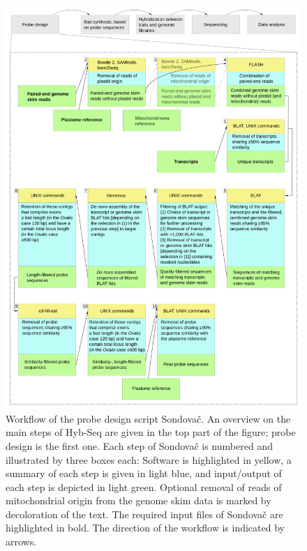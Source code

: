 \documentclass[a4paper, 11pt, twoside]{article}
\begin{document}
\begin{figure}[p]
\begin{center}
\includegraphics[width=14cm]{pipeline_workflow.png}
\end{center}
\caption[Workflow of the probe design script Sondovač]{Workflow of the probe design script Sondovač. An overview on the main steps of Hyb-Seq are given in the top part of the figure; probe design is the first one. Each step of Sondovač is numbered and illustrated by three boxes each: Software is highlighted in yellow, a summary of each step is given in light blue, and input/output of each step is depicted in light green. Optional removal of reads of mitochondrial origin from the genome skim data is marked by decoloration of the text. The required input files of Sondovač are highlighted in bold. The direction of the workflow is indicated by arrows.}
\label{pipeline-workflow}
\end{figure}
\end{document}
